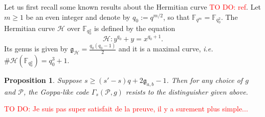 \documentclass[a4paper]{article}
\newtheorem{proposition}[thm]{Proposition}
\theoremstyle{definition}
\theoremstyle{remark}
\newcommand{\calP}{\mathcal{P}}
\newcommand{\calH}{\mathcal{H}}
\newcommand{\fqm}{\mathbb{F}_{q^m}}
\newcommand{\fqo}{\mathbb{F}_{q_0^2}}
\newcommand\TODO[1]{\textcolor{red}{TO DO: #1}}
\begin{document}
\noindent Let us first recall some known results about the Hermitian curve \TODO{ref}. Let $m \geq 1$  be an even integer and denote by $q_0 := q^{m/2}$, so that $\fqm = \fqo$. The Hermitian curve $\calH$ over $\fqo$ is defined by the equation
$$\calH : y^{q_0}+y = x^{q_0+1}.$$
Its genus is given by $\mathfrak{g}_{\calH} = \frac{q_0(q_0-1)}{2}$ and it is a maximal curve, \emph{i.e.} $\#\calH(\fqo) = q_0^3+1$.


\begin{proposition} \label{prop:Hermitian_Goppa_like_are_secured}
    Suppose $s \geq (s'-s)q+2\mathfrak{g}_{a,b}-1$. Then for any choice of $g$ and $\calP$, the Goppa-like code $\Gamma_s(\calP,g)$ resists to the distinguisher given above.
\end{proposition}

\TODO{Je suis pas super satisfait de la preuve, il y a surement plus simple...}
\end{document}
